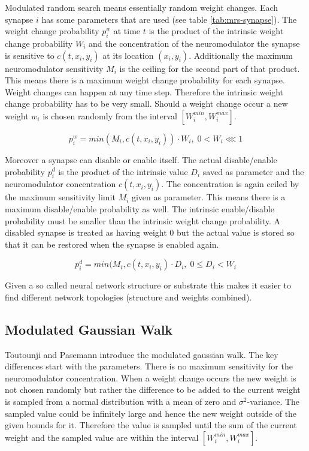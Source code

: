 \documentclass[12pt,twoside]{scrartcl}
\theoremstyle{plain}
\theoremstyle{definition}
\theoremstyle{remark}
\begin{document}
Modulated random search means essentially random weight changes. Each synapse \(i\)
has some parameters that are used (see table \ref{tab:mrs-synapse}). The weight
change probability \(p_i^w\) at time \(t\) is the product of the intrinsic weight
change probability \(W_i\) and the concentration of the neuromodulator the synapse
is sensitive to \(c(t, x_i, y_i)\) at its location \((x_i, y_i)\). Additionally
the maximum neuromodulator sensitivity \(M_i\) is the ceiling for the second part
of that product. This means there is a maximum weight change probability for each
synapse. Weight changes can happen at any time step. Therefore the intrinsic weight
change probability has to be very small. Should a weight change occur a new weight
\(w_i\) is chosen randomly from the interval \([W_i^{min}, W_i^{max}]\).


\[
    p_i^w = min(M_i, c(t, x_i, y_i)) \cdot W_i,\; 0 < W_i \lll 1
\]

Moreover a synapse can disable or enable itself. The actual disable/enable
probability \(p_i^d\) is the product of the intrinsic value \(D_i\) saved as
parameter and the neuromodulator concentration \(c(t, x_i, y_i)\). The concentration
is again ceiled by the maximum sensitivity limit \(M_i\) given as parameter.
This means there is a maximum disable/enable probability as well. The intrinsic
enable/disable probability must be smaller than the intrinsic weight change probability.
A disabled synapse is treated as having weight 0 but the actual value is stored
so that it can be restored when the synapse is enabled again.

\[
    p_i^d = min(M_i, c(t, x_i, y_i) \cdot D_i,\; 0 \leq D_i < W_i
\]

Given a so called neural network structure or substrate this makes it easier
to find different network topologies (structure and weights combined).

\subsection{Modulated Gaussian Walk}
\label{subsec:mgw}

Toutounji and Pasemann introduce the modulated gaussian walk. The key differences
start with the parameters. There is no maximum sensitivity for the neuromodulator
concentration. When a weight change occurs the new weight is not chosen randomly
but rather the difference to be added to the current weight is sampled from a
normal distribution with a mean of zero and \(\sigma^2\)-variance. The sampled
value could be infinitely large and hence the new weight outside of the given
bounds for it. Therefore the value is sampled until the sum of the
current weight and the sampled value are within the interval \([W_i^{min}, W_i^{max}]\).
\end{document}
